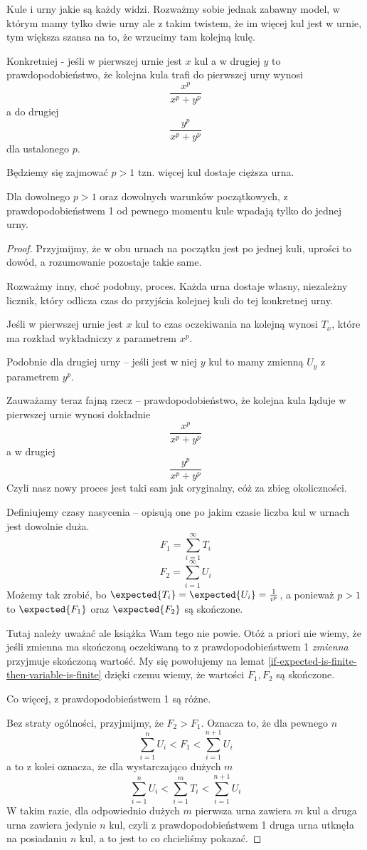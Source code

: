 Kule i urny jakie są każdy widzi. Rozważmy sobie jednak zabawny model, w którym mamy tylko dwie urny ale z takim twistem, że im więcej kul jest w urnie, tym większa szansa na to, że wrzucimy tam kolejną kulę.

Konkretniej - jeśli w pierwszej urnie jest \( x \) kul a w drugiej \( y \) to prawdopodobieństwo, że kolejna kula trafi do pierwszej urny wynosi \[ \frac{x^p}{x^p + y^p} \] a do drugiej \[ \frac{y^p}{x^p + y^p} \]
dla ustalonego \( p \).

Będziemy się zajmować \( p > 1 \) tzn. więcej kul dostaje cięższa urna.

\begin{theorem}
	Dla dowolnego \( p > 1 \) oraz dowolnych warunków początkowych, z prawdopodobieństwem 1 od pewnego momentu kule wpadają tylko do jednej urny.
\end{theorem}
\begin{proof}
	Przyjmijmy, że w obu urnach na początku jest po jednej kuli, uprości to dowód, a rozumowanie pozostaje takie same.

	Rozważmy inny, choć podobny, proces.
	Każda urna dostaje własny, niezależny licznik, który odlicza czas do przyjścia kolejnej kuli do tej konkretnej urny.

	Jeśli w pierwszej urnie jest \( x \) kul to czas oczekiwania na kolejną wynosi \( T_x \), które ma rozkład wykładniczy z parametrem \( x^p \).

	Podobnie dla drugiej urny -- jeśli jest w niej \( y \) kul to mamy zmienną \( U_y \) z parametrem \( y^p \).

	Zauważamy teraz fajną rzecz -- prawdopodobieństwo, że kolejna kula ląduje w pierwszej urnie wynosi dokładnie
	\[
		\frac{x^p}{x^p + y^p}
	\]
	a w drugiej
	\[
		\frac{y^p}{x^p + y^p}
	\]
	Czyli nasz nowy proces jest taki sam jak oryginalny, cóż za zbieg okoliczności.

	Definiujemy czasy nasycenia -- opisują one po jakim czasie liczba kul w urnach jest dowolnie duża.
	\[
		F_1 = \sum_{i=1}^\infty T_i
	\]
	\[
		F_2 = \sum_{i=1}^\infty U_i
	\]
	Możemy tak zrobić, bo \(\expected{T_i} = \expected{U_i} = \frac{1}{i^p}\), a ponieważ \( p > 1 \) to \( \expected{F_1}\) oraz \(\expected{F_2} \) są skończone.

	Tutaj należy uważać ale książka Wam tego nie powie.
	Otóż a priori nie wiemy, że jeśli zmienna ma skończoną oczekiwaną to z prawdopodobieństwem 1 \textit{zmienna} przyjmuje skończoną wartość.
	My się powołujemy na lemat \ref{if-expected-is-finite-then-variable-is-finite}
	dzięki czemu wiemy, że wartości \( F_1, F_2 \) są skończone.


	Co więcej, z prawdopodobieństwem 1 są różne.

	Bez straty ogólności, przyjmijmy, że \( F_2 > F_1 \). Oznacza to, że dla pewnego \( n \)
	\[
		\sum_{i=1}^n U_i < F_1 < \sum_{i=1}^{n+1} U_i
	\]
	a to z kolei oznacza, że dla wystarczająco dużych \( m \)
	\[
		\sum_{i=1}^n U_i < \sum_{i=1}^m T_i < \sum_{i=1}^{n+1} U_i
	\]
	W takim razie, dla odpowiednio dużych \( m \) pierwsza urna zawiera \( m \) kul a druga urna zawiera jedynie \( n \) kul, czyli z prawdopodobieństwem 1 druga urna utknęła na posiadaniu \( n \) kul, a to jest to co chcieliśmy pokazać.
\end{proof}


